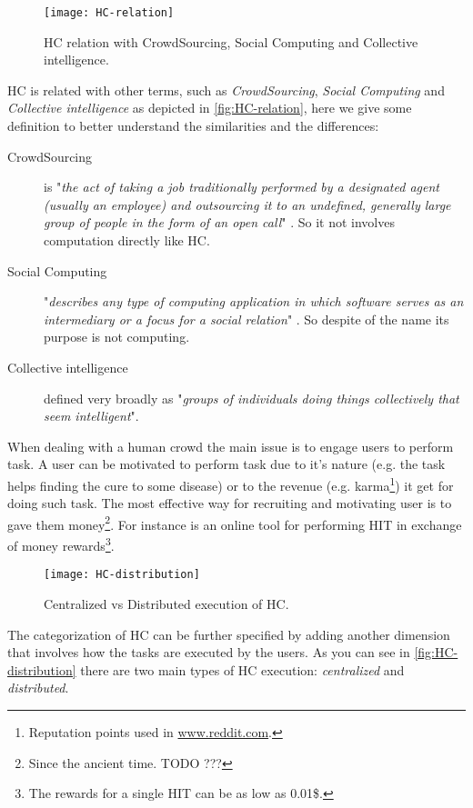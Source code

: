 \begin{figure}[htb]
    \centering
    \texttt{[image: HC-relation]}
    \caption{\acl{HC} relation with CrowdSourcing, Social Computing and Collective
    intelligence.}
    \label{fig:HC-relation}
\end{figure}
\acl{HC} is related with other terms, such as \emph{CrowdSourcing},
\emph{Social Computing} and \emph{Collective intelligence} as depicted in
\autoref{fig:HC-relation}, here we give some definition to better understand the
similarities and the differences:
\begin{description}
    \item[CrowdSourcing] is "\emph{the act of taking a job traditionally
    performed by a designated agent (usually an employee) and outsourcing it to an
    undefined, generally large group of people in the form of an open call}"
    \cite{howe2006rise}. So it not involves computation directly like \ac{HC}.

    \item[Social Computing] "\emph{describes any type of computing application
    in which software serves as an intermediary or a focus for a social relation}"
    \cite{schuler1994social}. So despite of the name its purpose is not computing.

    \item[Collective intelligence] defined very broadly as "\emph{groups of
    individuals doing things collectively that seem intelligent}".
\end{description}

When dealing with a human crowd the main issue is to engage users to perform task.
A user can be motivated to perform task due to it's nature
(e.g. the task helps finding the cure to some disease) or to the revenue (e.g.
karma\footnote{Reputation points used in \url{www.reddit.com}.}) it get for doing
such task. The most effective way for recruiting and motivating user is to gave
them money\footnote{Since the ancient time. TODO ???}. For instance
 is an online tool for performing \ac{HIT} in exchange of money
rewards\footnote{The rewards for a single \ac{HIT} can be as low as 0.01\$.}.\\

\begin{figure}[htb]
    \centering
    \texttt{[image: HC-distribution]}
    \caption{Centralized vs Distributed execution of \acl{HC}.}
    \label{fig:HC-distribution}
\end{figure}
The categorization of \ac{HC} can be further specified by adding another dimension
that involves how the tasks are executed by the users. As you can see in
\autoref{fig:HC-distribution} there are two main types of \ac{HC} execution:
\emph{centralized} and \emph{distributed}.







